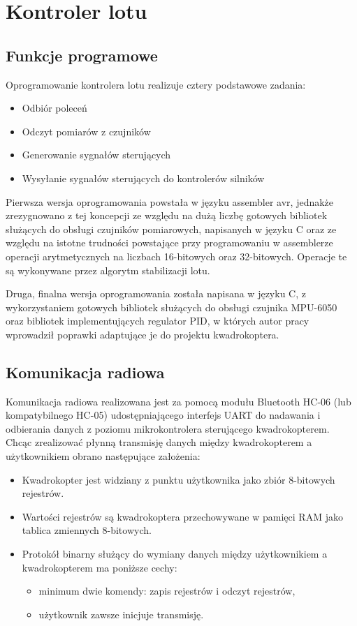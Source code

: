 \section{Kontroler lotu}

\subsection{Funkcje programowe}

Oprogramowanie kontrolera lotu realizuje cztery podstawowe zadania:

\begin{itemize}
	\item Odbiór poleceń 
	\item Odczyt pomiarów z czujników
	\item Generowanie sygnałów sterujących 
	\item Wysyłanie sygnałów sterujących do kontrolerów silników
\end{itemize}

Pierwsza wersja oprogramowania powstała w języku assembler avr, jednakże zrezygnowano z tej koncepcji ze względu na dużą liczbę gotowych bibliotek służących do obsługi czujników pomiarowych, napisanych w języku C oraz ze względu na istotne trudności powstające przy programowaniu w assemblerze operacji arytmetycznych na liczbach 16-bitowych oraz 32-bitowych. Operacje te są wykonywane przez algorytm stabilizacji lotu. 

Druga, finalna wersja oprogramowania została napisana w języku C, z wykorzystaniem gotowych bibliotek służących do obsługi czujnika MPU-6050 oraz bibliotek implementujących regulator PID, w których autor pracy wprowadził poprawki adaptujące je do projektu kwadrokoptera.


\subsection{Komunikacja radiowa}

Komunikacja radiowa realizowana jest za pomocą modułu Bluetooth HC-06 (lub kompatybilnego HC-05) udostępniającego interfejs UART do nadawania i odbierania danych z poziomu mikrokontrolera sterującego kwadrokopterem.
Chcąc zrealizować płynną transmisję danych między kwadrokopterem a użytkownikiem obrano następujące założenia:
\begin{itemize}
	\item Kwadrokopter jest widziany z punktu użytkownika jako zbiór 8-bitowych rejestrów.
	\item Wartości rejestrów są kwadrokoptera przechowywane w pamięci RAM jako tablica zmiennych 8-bitowych.
	\item Protokół binarny służący do wymiany danych między użytkownikiem a kwadrokopterem ma poniższe cechy:
	\begin{itemize}
		\item minimum dwie komendy: zapis rejestrów i odczyt rejestrów,
		\item użytkownik zawsze inicjuje transmisję.
	\end{itemize} 
\end{itemize}

